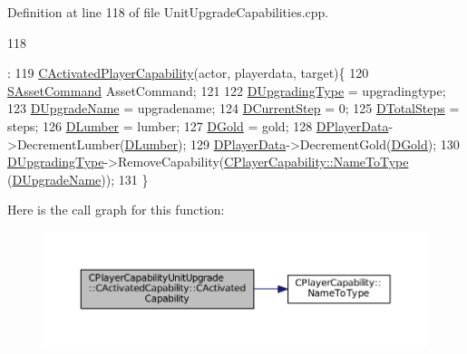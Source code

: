 Definition at line 118 of file Unit\+Upgrade\+Capabilities.\+cpp.


\begin{DoxyCode}
118                                                                                                            
                                                                                                                  
                                                                                        :
119 \hyperlink{classCActivatedPlayerCapability_a1ece00ffb6a7b925c84dd94a7407a0d1}{CActivatedPlayerCapability}(actor, playerdata, target)\{
120     \hyperlink{structSAssetCommand}{SAssetCommand} AssetCommand;
121     
122     \hyperlink{classCPlayerCapabilityUnitUpgrade_1_1CActivatedCapability_a028e222f2adc8a1035090487c93b358b}{DUpgradingType} = upgradingtype;
123     \hyperlink{classCPlayerCapabilityUnitUpgrade_1_1CActivatedCapability_acb0261591d692393b3c864d75edc799f}{DUpgradeName} = upgradename;
124     \hyperlink{classCPlayerCapabilityUnitUpgrade_1_1CActivatedCapability_a3ffaf9372ee622c3ef439396dfd00db6}{DCurrentStep} = 0;
125     \hyperlink{classCPlayerCapabilityUnitUpgrade_1_1CActivatedCapability_a56d9f9fd76c8757955e84ae8f56d5337}{DTotalSteps} = steps;
126     \hyperlink{classCPlayerCapabilityUnitUpgrade_1_1CActivatedCapability_aa4de5f57ea9d8dd85d7e6f62015c4a8d}{DLumber} = lumber;
127     \hyperlink{classCPlayerCapabilityUnitUpgrade_1_1CActivatedCapability_a259a99f41ef918edf79f6827dec06559}{DGold} = gold;
128     \hyperlink{classCActivatedPlayerCapability_a9bf27c322a73f4b11c8183cc1973c3d8}{DPlayerData}->DecrementLumber(\hyperlink{classCPlayerCapabilityUnitUpgrade_1_1CActivatedCapability_aa4de5f57ea9d8dd85d7e6f62015c4a8d}{DLumber});
129     \hyperlink{classCActivatedPlayerCapability_a9bf27c322a73f4b11c8183cc1973c3d8}{DPlayerData}->DecrementGold(\hyperlink{classCPlayerCapabilityUnitUpgrade_1_1CActivatedCapability_a259a99f41ef918edf79f6827dec06559}{DGold});
130     \hyperlink{classCPlayerCapabilityUnitUpgrade_1_1CActivatedCapability_a028e222f2adc8a1035090487c93b358b}{DUpgradingType}->RemoveCapability(\hyperlink{classCPlayerCapability_a920a696526e8a839f728192aea0ba1c5}{CPlayerCapability::NameToType}
      (\hyperlink{classCPlayerCapabilityUnitUpgrade_1_1CActivatedCapability_acb0261591d692393b3c864d75edc799f}{DUpgradeName}));
131 \}
\end{DoxyCode}
Here is the call graph for this function\+:
\nopagebreak
\begin{figure}[H]
\begin{center}
\leavevmode
\includegraphics[width=350pt]{classCPlayerCapabilityUnitUpgrade_1_1CActivatedCapability_a567ef5f24fbf77a0be2d7340cd980c4a_cgraph}
\end{center}
\end{figure}
